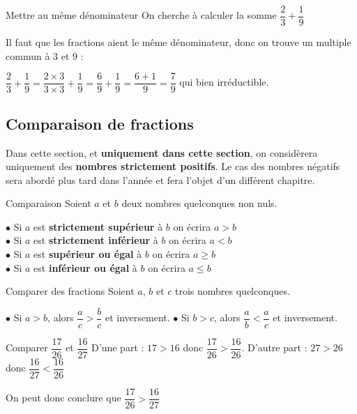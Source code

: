\documentclass[oneside,12pt]{article}          %
\begin{document}
\begin{exemple}{Mettre au même dénominateur} 
	On cherche à calculer la somme $\dfrac{2}{3}+\dfrac{1}{9}$ 
	
	Il faut que les fractions aient le même dénominateur, donc on trouve un multiple commun à $3$ et $9$ : 
	
	$\dfrac{2}{3} + \dfrac{1}{9} = \dfrac{2 \times 3}{3 \times 3} + \dfrac{1}{9} = \dfrac{6}{9} + \dfrac{1}{9} = \dfrac{6+1}{9} = \dfrac{7}{9}$ \quad qui bien irréductible.
\end{exemple}



\subsection{Comparaison de fractions}

Dans cette section, et \textbf{uniquement dans cette section}, on considèrera uniquement des \textbf{nombres strictement positifs}. Le cas des nombres négatifs sera abordé plus tard dans l'année et fera l'objet d'un différent chapitre.

\begin{rappel}{Comparaison} \restoreskip
	Soient $a$ et $b$ deux nombres quelconques non nuls.
	
	$\bullet$ Si $a$ est \textbf{strictement supérieur} à $b$ on écrira $a > b$ \\
	$\bullet$ Si $a$ est \textbf{strictement inférieur} à $b$ on écrira $a < b$ \\
	$\bullet$ Si $a$ est \textbf{supérieur ou égal} à $b$ on écrira $a \geq b$ \\
	$\bullet$ Si $a$ est \textbf{inférieur ou égal} à $b$ on écrira $a \leq b$ 
\end{rappel}



\begin{propriete}{Comparer des fractions} \restoreskip
	Soient $a$, $b$ et $c$ trois nombres quelconques.
	
	$\bullet$ Si $a > b$, alors $\dfrac{a}{c} > \dfrac{b}{c}$ \quad et inversement.	 \qquad \qquad
	$\bullet$ Si $b > c$, alors $\dfrac{a}{b} < \dfrac{a}{c}$ \quad et inversement.
\end{propriete}

\begin{exemple}{Comparer $\dfrac{17}{26}$ et $\dfrac{16}{27}$} \restoreskip
	D'une part : $17 > 16$ donc $\dfrac{17}{26} > \dfrac{16}{26}$. \qquad
	D'autre part : $27 > 26$ donc $\dfrac{16}{27} < \dfrac{16}{26}$
	
	On peut donc conclure que $\dfrac{17}{26} > \dfrac{16}{27}$
\end{exemple}
	
\end{document}
